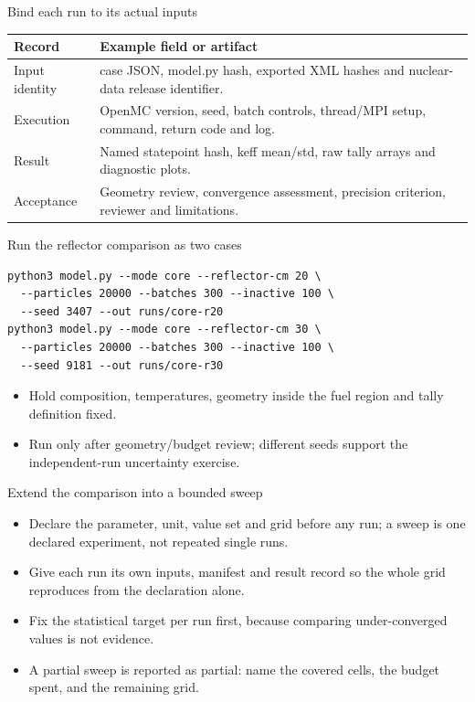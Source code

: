 \documentclass[aspectratio=169,11pt]{beamer}
\begin{document}
\begin{frame}[t,fragile]{Bind each run to its actual inputs}
\fontsize{10.5}{12.5}\selectfont\setlength{\tabcolsep}{4pt}\renewcommand{\arraystretch}{1.15}
\begin{tabular}{>{\raggedright\arraybackslash}p{}>{\raggedright\arraybackslash}p{}}
\toprule
\textbf{Record} & \textbf{Example field or artifact} \\ \midrule
Input identity & case JSON, model.py hash, exported XML hashes and nuclear-data release identifier. \\[2pt]
Execution & OpenMC version, seed, batch controls, thread/MPI setup, command, return code and log. \\[2pt]
Result & Named statepoint hash, keff mean/std, raw tally arrays and diagnostic plots. \\[2pt]
Acceptance & Geometry review, convergence assessment, precision criterion, reviewer and limitations. \\[2pt]
\bottomrule\end{tabular}\par\vspace{2mm}
\end{frame}
\begin{frame}[t,fragile]{Run the reflector comparison as two cases}
\begin{lstlisting}
python3 model.py --mode core --reflector-cm 20 \
  --particles 20000 --batches 300 --inactive 100 \
  --seed 3407 --out runs/core-r20
python3 model.py --mode core --reflector-cm 30 \
  --particles 20000 --batches 300 --inactive 100 \
  --seed 9181 --out runs/core-r30
\end{lstlisting}
\fontsize{10.5}{12.5}\selectfont
\begin{itemize}\setlength{\itemsep}{2mm}
\item Hold composition, temperatures, geometry inside the fuel region and tally definition fixed.
\item Run only after geometry/budget review; different seeds support the independent-run uncertainty exercise.
\end{itemize}
\end{frame}
\begin{frame}[t,fragile]{Extend the comparison into a bounded sweep}
\fontsize{11.5}{14}\selectfont
\begin{itemize}\setlength{\itemsep}{2mm}
\item Declare the parameter, unit, value set and grid before any run; a sweep is one declared experiment, not repeated single runs.
\item Give each run its own inputs, manifest and result record so the whole grid reproduces from the declaration alone.
\item Fix the statistical target per run first, because comparing under-converged values is not evidence.
\item A partial sweep is reported as partial: name the covered cells, the budget spent, and the remaining grid.
\end{itemize}
\end{frame}
\end{document}
